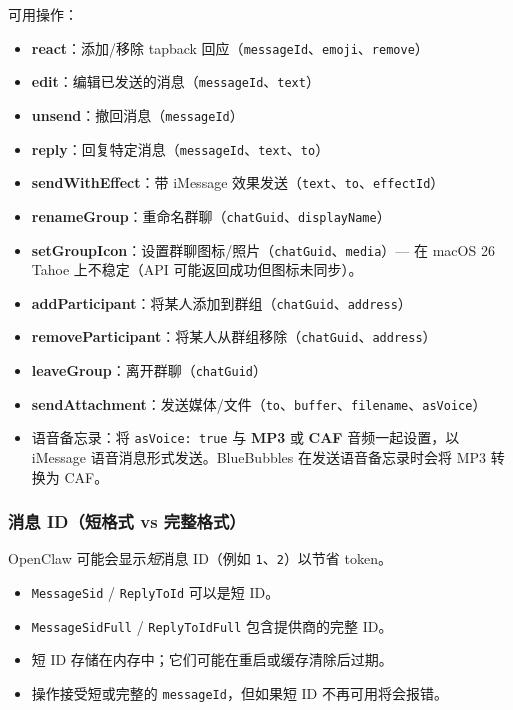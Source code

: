 可用操作：

\begin{itemize}
  \item \textbf{react}：添加/移除 tapback 回应（\texttt{messageId}、\texttt{emoji}、\texttt{remove}）
  \item \textbf{edit}：编辑已发送的消息（\texttt{messageId}、\texttt{text}）
  \item \textbf{unsend}：撤回消息（\texttt{messageId}）
  \item \textbf{reply}：回复特定消息（\texttt{messageId}、\texttt{text}、\texttt{to}）
  \item \textbf{sendWithEffect}：带 iMessage 效果发送（\texttt{text}、\texttt{to}、\texttt{effectId}）
  \item \textbf{renameGroup}：重命名群聊（\texttt{chatGuid}、\texttt{displayName}）
  \item \textbf{setGroupIcon}：设置群聊图标/照片（\texttt{chatGuid}、\texttt{media}）— 在 macOS 26 Tahoe 上不稳定（API 可能返回成功但图标未同步）。
  \item \textbf{addParticipant}：将某人添加到群组（\texttt{chatGuid}、\texttt{address}）
  \item \textbf{removeParticipant}：将某人从群组移除（\texttt{chatGuid}、\texttt{address}）
  \item \textbf{leaveGroup}：离开群聊（\texttt{chatGuid}）
  \item \textbf{sendAttachment}：发送媒体/文件（\texttt{to}、\texttt{buffer}、\texttt{filename}、\texttt{asVoice}）
  \item 语音备忘录：将 \texttt{asVoice: true} 与 \textbf{MP3} 或 \textbf{CAF} 音频一起设置，以 iMessage 语音消息形式发送。BlueBubbles 在发送语音备忘录时会将 MP3 转换为 CAF。
\end{itemize}


\subsubsection{消息 ID（短格式 vs 完整格式）}


OpenClaw 可能会显示\textit{短}消息 ID（例如 \texttt{1}、\texttt{2}）以节省 token。

\begin{itemize}
  \item \texttt{MessageSid} / \texttt{ReplyToId} 可以是短 ID。
  \item \texttt{MessageSidFull} / \texttt{ReplyToIdFull} 包含提供商的完整 ID。
  \item 短 ID 存储在内存中；它们可能在重启或缓存清除后过期。
  \item 操作接受短或完整的 \texttt{messageId}，但如果短 ID 不再可用将会报错。
\end{itemize}


